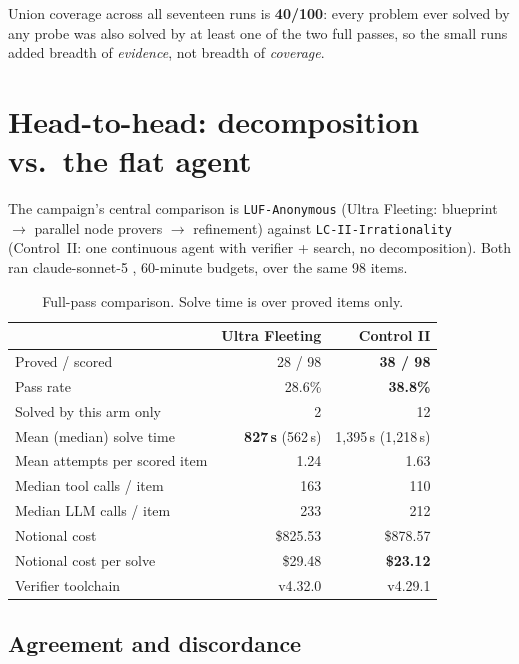 \documentclass[12pt, a4paper]{article}
\newcommand{\run}[1]{\texttt{#1}}
\begin{document}
Union coverage across all seventeen runs is \textbf{40/100}: every problem ever
solved by any probe was also solved by at least one of the two full passes, so
the small runs added breadth of \emph{evidence}, not breadth of \emph{coverage}.

\section{Head-to-head: decomposition vs.\ the flat agent}
\label{sec:headtohead}

The campaign's central comparison is \run{LUF-Anonymous} (Ultra Fleeting:
blueprint $\to$ parallel node provers $\to$ refinement) against
\run{LC-II-Irrationality} (Control~II: one continuous agent with verifier +
search, no decomposition). Both ran claude-sonnet-5
\cite{anthropic2026sonnet5}, 60-minute budgets, over the same 98 items.

\begin{table}[H]
\centering\small
\caption{Full-pass comparison. Solve time is over proved items only.}
\label{tab:headtohead}
\begin{tabular}{@{}lrr@{}}
\toprule
 & Ultra Fleeting & Control II \\
\midrule
Proved / scored          & 28 / 98 & \textbf{38 / 98} \\
Pass rate                & 28.6\% & \textbf{38.8\%} \\
Solved by this arm only  & 2 & 12 \\
Mean (median) solve time & \textbf{827\,s} (562\,s) & 1{,}395\,s (1{,}218\,s) \\
Mean attempts per scored item & 1.24 & 1.63 \\
Median tool calls / item      & 163 & 110 \\
Median LLM calls / item       & 233 & 212 \\
Notional cost                 & \$825.53 & \$878.57 \\
Notional cost per solve       & \$29.48 & \textbf{\$23.12} \\
Verifier toolchain            & v4.32.0 & v4.29.1 \\
\bottomrule
\end{tabular}
\end{table}

\subsection{Agreement and discordance}
\end{document}
